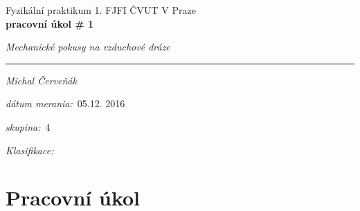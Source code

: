 \documentclass[a4paper,10pt]{article}
\begin{document}
\def\mean#1{\left< #1 \right>}
\noindent
{\large Fyzikální praktikum 1.} \hfil {\large FJFI ČVUT V Praze}\\
\noindent
{\large\textbf{pracovní úkol \# 1}}
\begin{center}
{\large\textit{Mechanické pokusy na vzduchové dráze}}
\end{center}
\noindent
\rule{\textwidth}{1px}
\vspace{\baselineskip}

\emph{Michal Červeňák}
\par
\vspace{\baselineskip}
\begin{minipage}[l]{0.5\textwidth}%
\textit{dátum merania:}~05.12. 2016\\%
\par%
\noindent%
\textit{skupina:}~4\\%
\par%
\noindent%
\textit{Klasifikace:}\dotfill\\%
\end{minipage}

\section{Pracovní úkol}
\end{document}
